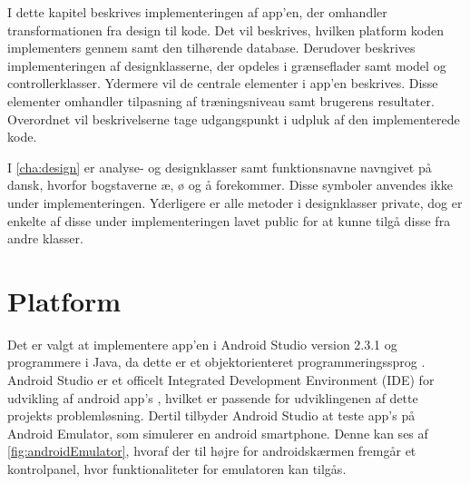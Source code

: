 I dette kapitel beskrives implementeringen af app'en, der omhandler transformationen fra design til kode. Det vil beskrives, hvilken platform koden implementers gennem samt den tilhørende database. Derudover beskrives implementeringen af designklasserne, der opdeles i grænseflader samt model og controllerklasser. Ydermere vil de centrale elementer i app'en beskrives. Disse elementer omhandler tilpasning af træningsniveau samt brugerens resultater. Overordnet vil beskrivelserne tage udgangspunkt i udpluk af den implementerede kode.

I \autoref{cha:design} er analyse- og designklasser samt funktionsnavne navngivet på dansk, hvorfor bogstaverne æ, ø og å forekommer. Disse symboler anvendes ikke under implementeringen. Yderligere er alle metoder i designklasser private, dog er enkelte af disse under implementeringen lavet public for at kunne tilgå disse fra andre klasser. 

\section{Platform}
Det er valgt at implementere app'en i Android Studio version 2.3.1 og programmere i Java, da dette er et objektorienteret programmeringssprog \cite{Brahma2015}. Android Studio er et officelt Integrated Development Environment (IDE) for udvikling af android app's \cite{android2017}, hvilket er passende for udviklingenen af dette projekts problemløsning. Dertil tilbyder Android Studio at teste app's på Android Emulator, som simulerer en android smartphone. Denne kan ses af \autoref{fig:androidEmulator}, hvoraf der til højre for androidskærmen fremgår et kontrolpanel, hvor funktionaliteter for emulatoren kan tilgås. 

